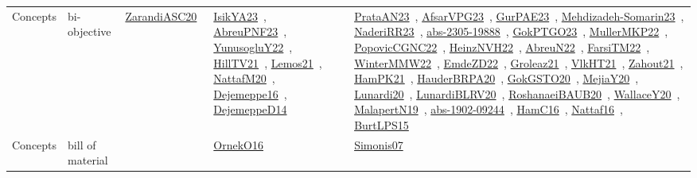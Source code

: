 {\begin{longtable}{lp{3cm}>{\raggedright\arraybackslash}p{6cm}>{\raggedright\arraybackslash}p{6cm}>{\raggedright\arraybackslash}p{8cm}}
Concepts & bi-objective & \href{../works/ZarandiASC20.pdf}{ZarandiASC20}~\cite{ZarandiASC20} & \href{../works/IsikYA23.pdf}{IsikYA23}~\cite{IsikYA23}, \href{../works/AbreuPNF23.pdf}{AbreuPNF23}~\cite{AbreuPNF23}, \href{../works/YunusogluY22.pdf}{YunusogluY22}~\cite{YunusogluY22}, \href{../works/HillTV21.pdf}{HillTV21}~\cite{HillTV21}, \href{../works/Lemos21.pdf}{Lemos21}~\cite{Lemos21}, \href{../works/NattafM20.pdf}{NattafM20}~\cite{NattafM20}, \href{../works/Dejemeppe16.pdf}{Dejemeppe16}~\cite{Dejemeppe16}, \href{../works/DejemeppeD14.pdf}{DejemeppeD14}~\cite{DejemeppeD14} & \href{../works/PrataAN23.pdf}{PrataAN23}~\cite{PrataAN23}, \href{../works/AfsarVPG23.pdf}{AfsarVPG23}~\cite{AfsarVPG23}, \href{../works/GurPAE23.pdf}{GurPAE23}~\cite{GurPAE23}, \href{../works/Mehdizadeh-Somarin23.pdf}{Mehdizadeh-Somarin23}~\cite{Mehdizadeh-Somarin23}, \href{../works/NaderiRR23.pdf}{NaderiRR23}~\cite{NaderiRR23}, \href{../works/abs-2305-19888.pdf}{abs-2305-19888}~\cite{abs-2305-19888}, \href{../works/GokPTGO23.pdf}{GokPTGO23}~\cite{GokPTGO23}, \href{../works/MullerMKP22.pdf}{MullerMKP22}~\cite{MullerMKP22}, \href{../works/PopovicCGNC22.pdf}{PopovicCGNC22}~\cite{PopovicCGNC22}, \href{../works/HeinzNVH22.pdf}{HeinzNVH22}~\cite{HeinzNVH22}, \href{../works/AbreuN22.pdf}{AbreuN22}~\cite{AbreuN22}, \href{../works/FarsiTM22.pdf}{FarsiTM22}~\cite{FarsiTM22}, \href{../works/WinterMMW22.pdf}{WinterMMW22}~\cite{WinterMMW22}, \href{../works/EmdeZD22.pdf}{EmdeZD22}~\cite{EmdeZD22}, \href{../works/Groleaz21.pdf}{Groleaz21}~\cite{Groleaz21}, \href{../works/VlkHT21.pdf}{VlkHT21}~\cite{VlkHT21}, \href{../works/Zahout21.pdf}{Zahout21}~\cite{Zahout21}, \href{../works/HamPK21.pdf}{HamPK21}~\cite{HamPK21}, \href{../works/HauderBRPA20.pdf}{HauderBRPA20}~\cite{HauderBRPA20}, \href{../works/GokGSTO20.pdf}{GokGSTO20}~\cite{GokGSTO20}, \href{../works/MejiaY20.pdf}{MejiaY20}~\cite{MejiaY20}, \href{../works/Lunardi20.pdf}{Lunardi20}~\cite{Lunardi20}, \href{../works/LunardiBLRV20.pdf}{LunardiBLRV20}~\cite{LunardiBLRV20}, \href{../works/RoshanaeiBAUB20.pdf}{RoshanaeiBAUB20}~\cite{RoshanaeiBAUB20}, \href{../works/WallaceY20.pdf}{WallaceY20}~\cite{WallaceY20}, \href{../works/MalapertN19.pdf}{MalapertN19}~\cite{MalapertN19}, \href{../works/abs-1902-09244.pdf}{abs-1902-09244}~\cite{abs-1902-09244}, \href{../works/HamC16.pdf}{HamC16}~\cite{HamC16}, \href{../works/Nattaf16.pdf}{Nattaf16}~\cite{Nattaf16}, \href{../works/BurtLPS15.pdf}{BurtLPS15}~\cite{BurtLPS15}\\
Concepts & bill of material &  & \href{../works/OrnekO16.pdf}{OrnekO16}~\cite{OrnekO16} & \href{../works/Simonis07.pdf}{Simonis07}~\cite{Simonis07}\\

\end{longtable}}
